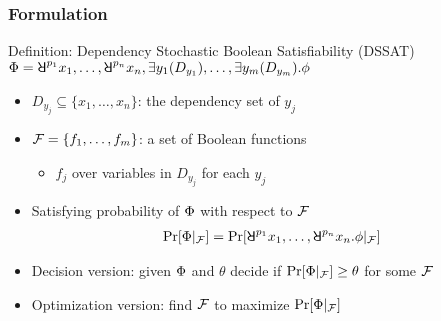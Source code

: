 \begin{frame}
  \frametitle{Formulation}
  \begin{block}{Definition: Dependency Stochastic Boolean Satisfiability (DSSAT)}
    \belowdisplayskip=0pt
    $\Qf=\random{p_1} x_1, \ldots, \random{p_n} x_n, \exists y_1(D_{y_1}), \ldots, \exists y_m(D_{y_m}).\pf$
    \pause
    \begin{itemize}
      \item $D_{y_j} \subseteq \{x_1,\ldots,x_n\}$: the \alert{dependency set} of $y_j$
            \pause
      \item $\mathcal{F}=\{f_1,\ldots,f_m\}$: a set of Boolean functions
            \pause
            \begin{itemize}
              \item $f_j$ over variables in $D_{y_j}$ for each $y_j$
            \end{itemize}
            \pause
      \item Satisfying probability of $\Phi$ with respect to $\mathcal{F}$
            \pause
            \begin{align*}
              \spb{\pcf{\Qf}{\skf}}=\Pr[\random{p_1} x_1, \ldots, \random{p_n} x_n.\pf|_{\skf}]
            \end{align*}
            \pause
      \item Decision version: given $\Phi$ and $\theta$ decide if $\Pr[\Phi|_{\mathcal{F}}] \geq \theta$ for some $\mathcal{F}$
            \pause
      \item Optimization version: find $\mathcal{F}$ to maximize $\Pr[\Phi|_{\mathcal{F}}]$
    \end{itemize}
  \end{block}
\end{frame}

